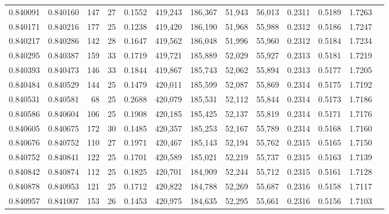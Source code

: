 \begin{tabular}{rrrrrrrrrrrrr}
0.840091 & 0.840160 &   147 &  27 &                                     0.1552 & 419,243 & 186,367 &  51,943 &  56,013 & 0.2311 & 0.5189 & 1.7263 \\
0.840171 & 0.840216 &   177 &  25 &                                     0.1238 & 419,420 & 186,190 &  51,968 &  55,988 & 0.2312 & 0.5186 & 1.7247 \\
0.840217 & 0.840286 &   142 &  28 &                                     0.1647 & 419,562 & 186,048 &  51,996 &  55,960 & 0.2312 & 0.5184 & 1.7234 \\
0.840295 & 0.840387 &   159 &  33 &                                     0.1719 & 419,721 & 185,889 &  52,029 &  55,927 & 0.2313 & 0.5181 & 1.7219 \\
0.840393 & 0.840473 &   146 &  33 &                                     0.1844 & 419,867 & 185,743 &  52,062 &  55,894 & 0.2313 & 0.5177 & 1.7205 \\
0.840484 & 0.840529 &   144 &  25 &                                     0.1479 & 420,011 & 185,599 &  52,087 &  55,869 & 0.2314 & 0.5175 & 1.7192 \\
0.840531 & 0.840581 &    68 &  25 &                                     0.2688 & 420,079 & 185,531 &  52,112 &  55,844 & 0.2314 & 0.5173 & 1.7186 \\
0.840586 & 0.840604 &   106 &  25 &                                     0.1908 & 420,185 & 185,425 &  52,137 &  55,819 & 0.2314 & 0.5171 & 1.7176 \\
0.840605 & 0.840675 &   172 &  30 &                                     0.1485 & 420,357 & 185,253 &  52,167 &  55,789 & 0.2314 & 0.5168 & 1.7160 \\
0.840676 & 0.840752 &   110 &  27 &                                     0.1971 & 420,467 & 185,143 &  52,194 &  55,762 & 0.2315 & 0.5165 & 1.7150 \\
0.840752 & 0.840841 &   122 &  25 &                                     0.1701 & 420,589 & 185,021 &  52,219 &  55,737 & 0.2315 & 0.5163 & 1.7139 \\
0.840842 & 0.840874 &   112 &  25 &                                     0.1825 & 420,701 & 184,909 &  52,244 &  55,712 & 0.2315 & 0.5161 & 1.7128 \\
0.840878 & 0.840953 &   121 &  25 &                                     0.1712 & 420,822 & 184,788 &  52,269 &  55,687 & 0.2316 & 0.5158 & 1.7117 \\
0.840957 & 0.841007 &   153 &  26 &                                     0.1453 & 420,975 & 184,635 &  52,295 &  55,661 & 0.2316 & 0.5156 & 1.7103 \\

\end{tabular}
